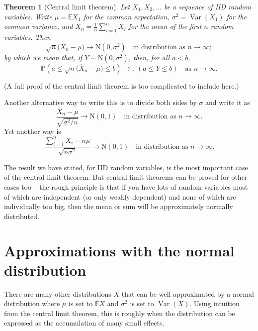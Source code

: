 \documentclass[
  a4paper,
]{book}
\newtheorem{theorem}{Theorem}[chapter]
\theoremstyle{definition}
\theoremstyle{definition}
\theoremstyle{definition}
\theoremstyle{definition}
\theoremstyle{remark}
\begin{document}
\begin{theorem}[Central limit theorem]
\protect\hypertarget{thm:thCLT}{}\label{thm:thCLT}Let \(X_1, X_2, \dots\) be a sequence of IID random variables. Write \(\mu = \mathbb EX_1\) for the common expectation, \(\sigma^2 = \operatorname{Var}(X_1)\) for the common variance, and \(\overline X_n =\frac{1}{n} \sum_{i=1}^n X_i\) for the mean of the first \(n\) random variables. Then
\[ \sqrt{n}\big(\overline X_n - \mu\big) \to \mathrm N(0, \sigma^2) \quad \text{in distribution as $n \to \infty$}; \]
by which we mean that, if \(Y \sim \mathrm N(0, \sigma^2)\), then, for all \(a < b\),
\[ \mathbb P\left(a \leq \sqrt{n}\big(\overline X_n - \mu\big) \leq b \right) \to \mathbb P(a \leq Y \leq b) \quad \text{as $n\to\infty$.} \]
\end{theorem}

(A full proof of the central limit theorem is too complicated to include here.)

Another alternative way to write this is to divide both sides by \(\sigma\) and write it as
\[ \frac{\overline X_n - \mu}{\sqrt{\sigma^2/n}} \to \mathrm N(0, 1) \quad \text{in distribution as $n \to \infty$}. \]
Yet another way is
\[ \frac{\sum_{i=1}^n X_i - n\mu}{\sqrt{n\sigma^2}} \to \mathrm N(0, 1) \quad \text{in distribution as $n \to \infty$}. \]

The result we have stated, for IID random variables, is the most important case of the central limit theorem. But central limit theorems can be proved for other cases too -- the rough principle is that if you have lots of random variables most of which are independent (or only weakly dependent) and none of which are individually too big, then the mean or sum will be approximately normally distributed.

\hypertarget{normal-approx}{%
\section{Approximations with the normal distribution}\label{normal-approx}}

There are many other distributions \(X\) that can be well approximated by a normal distribution where \(\mu\) is set to \(\mathbb EX\) and \(\sigma^2\) is set to \(\operatorname{Var}(X)\). Using intuition from the central limit theorem, this is roughly when the distribution can be expressed as the accumulation of many small effects.
\end{document}
